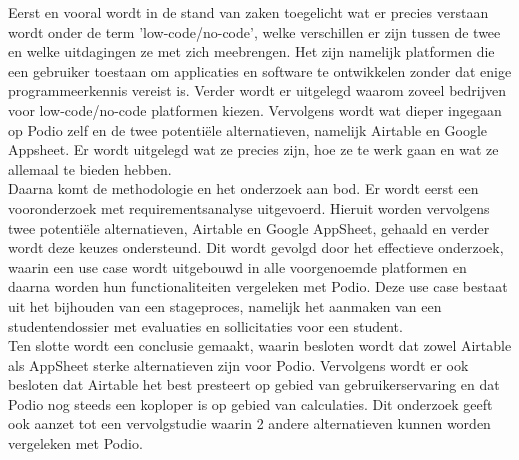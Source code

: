 Eerst en vooral wordt in de stand van zaken toegelicht wat er precies verstaan wordt onder de term 'low-code/no-code', welke verschillen er zijn tussen de twee en welke uitdagingen ze met zich meebrengen. Het zijn namelijk platformen die een gebruiker toestaan om applicaties en software te ontwikkelen zonder dat enige programmeerkennis vereist is. Verder wordt er uitgelegd waarom zoveel bedrijven voor low-code/no-code platformen kiezen. Vervolgens wordt wat dieper ingegaan op Podio zelf en de twee potentiële alternatieven, namelijk Airtable en Google Appsheet. Er wordt uitgelegd wat ze precies zijn, hoe ze te werk gaan en wat ze allemaal te bieden hebben. \\

Daarna komt de methodologie en het onderzoek aan bod. Er wordt eerst een vooronderzoek met requirementsanalyse uitgevoerd. Hieruit worden vervolgens twee potentiële alternatieven, Airtable en Google AppSheet, gehaald en verder wordt deze keuzes ondersteund. Dit wordt gevolgd door het effectieve onderzoek, waarin een use case wordt uitgebouwd in alle voorgenoemde platformen en daarna worden hun functionaliteiten vergeleken met Podio. Deze use case bestaat uit het bijhouden van een stageproces, namelijk het aanmaken van een studentendossier met evaluaties en sollicitaties voor een student. \\ 

Ten slotte wordt een conclusie gemaakt, waarin besloten wordt dat zowel Airtable als AppSheet sterke alternatieven zijn voor Podio. Vervolgens wordt er ook besloten dat Airtable het best presteert op gebied van gebruikerservaring en dat Podio nog steeds een koploper is op gebied van calculaties. Dit onderzoek geeft ook aanzet tot een vervolgstudie waarin 2 andere alternatieven kunnen worden vergeleken met Podio. \\

